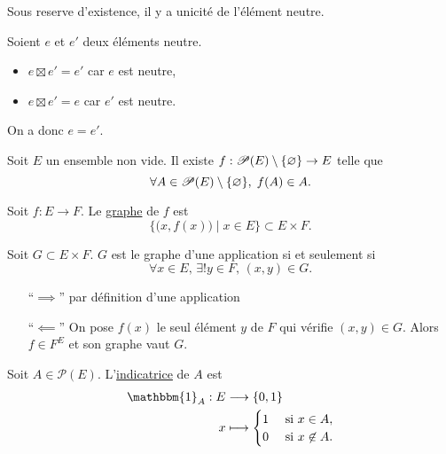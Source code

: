 \begin{prop}
	Sous reserve d'existence, il y a unicité de l'élément neutre.
\end{prop}

\begin{prv}
	Soient $e$ et $e'$ deux éléments neutre.
	\begin{itemize}
		\item $e \boxtimes e' = e'$ car $e$ est neutre,
		\item $e \boxtimes e' = e$ car $e'$ est neutre.
	\end{itemize} On a donc $e = e'$.
\end{prv}

\begin{axm}
	Soit $E$ un ensemble non vide. Il existe $f : \mathcal{P}(E) \setminus \{\varnothing\} \to E$ telle que \[
		\forall A \in \mathcal{P}(E) \setminus \{\varnothing\},\; f(A) \in A.
	\]
\end{axm}

\begin{defn}
	Soit $f: E \to F$. Le \underline{graphe}  de $f$ est \[
		\Big\{\big(x,f(x)\big)  \mid x \in E\Big\} \subset E \times F.
	\]
\end{defn}

\begin{prop}
	Soit $G \subset E\times F$. $G$ est le graphe d'une application si et seulement si \[
		\forall x \in E,\,\exists! y \in F,\, (x,y) \in G.
	\]
\end{prop}

\begin{prv}
	\begin{itemize}
		\item[``$\implies$''] par définition d'une application
		\item[``$\impliedby$''] On pose $f(x)$ le seul élément $y$ de $F$ qui vérifie $(x,y) \in G$. Alors $f \in F^E$ et son graphe vaut $G$.
	\end{itemize}
\end{prv}

\begin{defn}
	Soit $A \in \mathcal{P}(E)$. L'\underline{indicatrice} de $A$ est \begin{align*}
		\mathbbm{1}_A: E &\longrightarrow \{0,1\} \\
		x &\longmapsto \begin{cases}
			1 &\text{ si } x \in A,\\
			0 & \text{ si } x \not\in A.
		\end{cases}
	\end{align*}
\end{defn}

